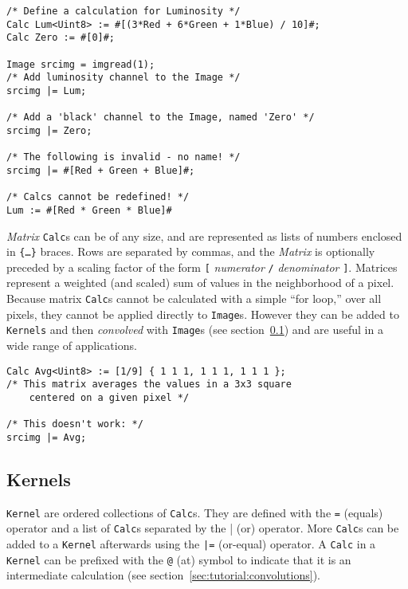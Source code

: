 \begin{lstlisting}[language=CLAM,escapechar=\%]
/* Define a calculation for Luminosity */
Calc Lum<Uint8> := #[(3*Red + 6*Green + 1*Blue) / 10]#;
Calc Zero := #[0]#;

Image srcimg = imgread(1);
/* Add luminosity channel to the Image */
srcimg |= Lum;

/* Add a 'black' channel to the Image, named 'Zero' */
srcimg |= Zero;

/* The following is invalid - no name! */
srcimg |= #[Red + Green + Blue]#;

/* Calcs cannot be redefined! */
Lum := #[Red * Green * Blue]#
\end{lstlisting}

\emph{Matrix} \texttt{Calc}s can be of any size, and are represented as lists of numbers enclosed in
\texttt{\{\ldots\}} braces. Rows are separated by commas, and the \emph{Matrix} is optionally preceded by
a scaling factor of the form \texttt{[} \emph{numerator} \texttt{/} \emph{denominator} \texttt{]}.
Matrices represent a weighted (and scaled) sum of values in the neighborhood of a pixel.
Because matrix \texttt{Calc}s cannot be calculated with a simple ``for loop,'' over all pixels,
they cannot be applied
directly to \texttt{Image}s. However they can be added to \texttt{Kernels} and then \emph{convolved}
with \texttt{Image}s (see section~\ref{sec:tutorial:kernels}) and are useful in a wide range of applications.\\

\begin{lstlisting}[language=CLAM,escapechar=\%]
Calc Avg<Uint8> := [1/9] { 1 1 1, 1 1 1, 1 1 1 };
/* This matrix averages the values in a 3x3 square
	centered on a given pixel */

/* This doesn't work: */
srcimg |= Avg;
\end{lstlisting}

\subsection{Kernels}\label{sec:tutorial:kernels}

\texttt{Kernel} are ordered collections of \texttt{Calc}s. They are defined with the \texttt{=} (equals) operator
and a list of \texttt{Calc}s separated by the | (or) operator. More \texttt{Calc}s can be added to
a \texttt{Kernel} afterwards using the \texttt{|=} (or-equal) operator. A \texttt{Calc} in a \texttt{Kernel}
can be prefixed with the \texttt{@} (at) symbol to indicate that it is an intermediate calculation
(see section~\ref{sec:tutorial:convolutions}).

